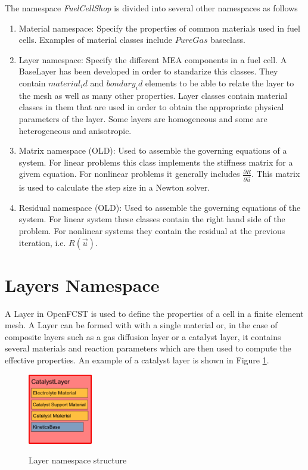 The namespace \textit{FuelCellShop} is divided into several other namespaces as follows
\begin{enumerate}
 \item Material namespace: Specify the properties of common materials used in fuel cells. Examples of material classes include $PureGas$ baseclass.
 \item Layer namespace: Specify the different MEA components in a fuel cell. A BaseLayer has been developed in order to standarize this classes. They contain $material_id$ and $bondary_id$ elements to be able to relate the layer to the mesh as well as many other properties. Layer classes contain material classes in them that are used in order to obtain the appropriate physical parameters of the layer. Some layers are homogeneous and some are heterogeneous and anisotropic.
 \item Matrix namespace (OLD): Used to assemble the governing equations of a system. For linear problems this class implements the stiffness matrix for a givem equation. For nonlinear problems it generally includes $\frac{\partial R}{\partial \vec{u}}$. This matrix is used to calculate the step size in a Newton solver.
 \item Residual namespace (OLD): Used to assemble the governing equations of the system. For linear system these classes contain the right hand side of the problem. For nonlinear systems they contain the residual at the previous iteration, i.e. $R(\vec{u})$.
\end{enumerate}

\section{Layers Namespace}

A Layer in OpenFCST is used to define the properties of a cell in a finite element mesh. A Layer can be formed with with a single material or, in the case of composite layers such as a gas diffusion layer or a catalyst layer, it contains several materials and reaction parameters which are then used to compute the effective properties. An example of a catalyst layer is shown in Figure \ref{fig:catalystlayerexample}. 

\begin{figure}[tbp]
\begin{center}
\includegraphics[width=0.25\textwidth]{figures/catalyst_layer_diagram.png}
\label{fig:catalystlayerexample}
\caption{Layer namespace structure}
\end{center}
\end{figure} 

